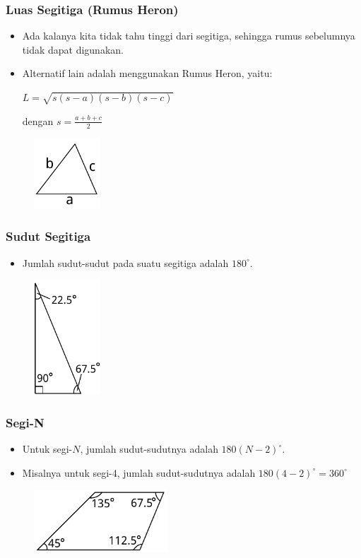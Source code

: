 \begin{frame}
\frametitle{Luas Segitiga (Rumus Heron)}
\begin{itemize}
  \item Ada kalanya kita tidak tahu tinggi dari segitiga, sehingga rumus sebelumnya tidak dapat digunakan.
  \item Alternatif lain adalah menggunakan Rumus Heron, yaitu:\newline
    
  \(\displaystyle L = \sqrt{s(s-a)(s-b)(s-c)} \) \newline 
  
  dengan \(\displaystyle s = \frac{a+b+c}{2}\)
  
\end{itemize}
\begin{figure}
  \includegraphics[width=2.5cm]{asset/triangle-heron.pdf}
\end{figure}
\end{frame}

\begin{frame}
\frametitle{Sudut Segitiga}
\begin{itemize}
  \item Jumlah sudut-sudut pada suatu segitiga adalah $180^{\circ}$.
\end{itemize}
\begin{figure}
  \includegraphics[width=2.5cm]{asset/triangle-angle.pdf}
\end{figure}
\end{frame}

\begin{frame}
\frametitle{Segi-N}
\begin{itemize}
  \item Untuk segi-$N$, jumlah sudut-sudutnya adalah $180(N - 2)^{\circ}$.
  \item Misalnya untuk segi-4, jumlah sudut-sudutnya adalah $180(4 - 2)^{\circ} = 360^{\circ}$
\end{itemize}
\begin{figure}
  \includegraphics[width=5cm]{asset/quadrangle-angle.pdf}
\end{figure}
\end{frame}

